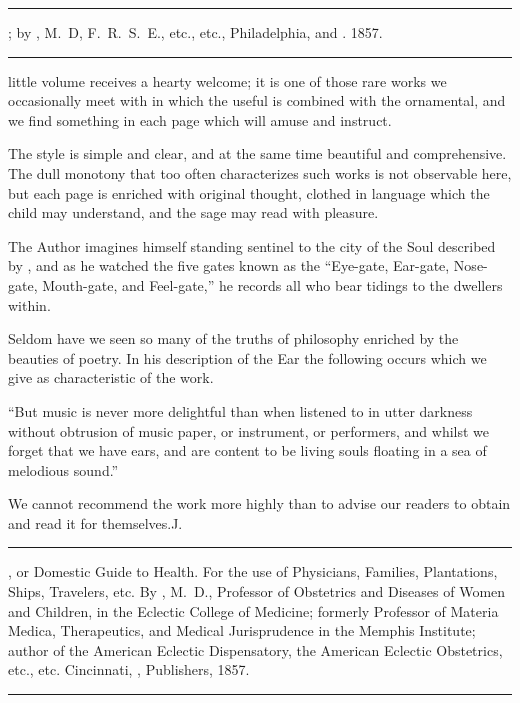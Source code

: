 
\fancybreak{* * *}
\footnotesize
{}; by , M.~D, F.~R.~S.~E., etc., etc.,
Philadelphia,  and . 1857.
\plainbreak{1}
\normalsize

 little volume receives a hearty welcome; it is one of those rare
works we occasionally meet with in which the useful is combined
with the ornamental, and we find something in each page which will
amuse and instruct.

The style is simple and clear, and at the same time beautiful and
comprehensive. The dull monotony that too often characterizes such
works is not observable here, but each page is enriched with original
thought, clothed in language which the child may understand, and the
sage may read with pleasure.

The Author imagines himself standing sentinel to the city of the Soul
described by , and as he watched the five gates known
as the ``Eye-gate, Ear-gate, Nose-gate, Mouth-gate, and Feel-gate,'' he
records all who bear tidings to the dwellers within.

Seldom have we seen so many of the truths of philosophy enriched
by the beauties of poetry. In his description of the Ear the following
occurs which we give as characteristic of the work.

``But music is never more delightful than when listened to in utter
darkness without obtrusion of music paper, or instrument, or performers,
and whilst we forget that we have ears, and are content to be living
souls floating in a sea of melodious sound.''

We cannot recommend the work more highly than to advise our readers
to obtain and read it for themselves.\hfill{}J.\quad{}

\fancybreak{* * *}

, or Domestic Guide to Health. For the use of Physicians,
Families, Plantations, Ships, Travelers, etc. By , M.~D., Professor of
Obstetrics and Diseases of Women and Children, in the Eclectic College of Medicine;
formerly Professor of Materia Medica, Therapeutics, and Medical Jurisprudence in the
Memphis Institute; author of the American Eclectic Dispensatory, the American
Eclectic Obstetrics, etc., etc. Cincinnati, , Publishers, 1857.
\plainbreak{1}
\normalsize

